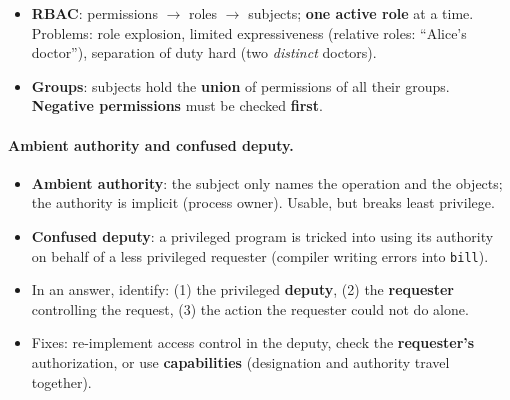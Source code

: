 \begin{itemize}
    \item \textbf{RBAC}: permissions $\to$ roles $\to$ subjects; \textbf{one active role} at a time. Problems: role explosion, limited expressiveness (relative roles: ``Alice's doctor''), separation of duty hard (two \emph{distinct} doctors).
    \item \textbf{Groups}: subjects hold the \textbf{union} of permissions of all their groups. \textbf{Negative permissions} must be checked \textbf{first}.
\end{itemize}

\paragraph{Ambient authority and confused deputy.}
\begin{itemize}
    \item \textbf{Ambient authority}: the subject only names the operation and the objects; the authority is implicit (process owner). Usable, but breaks least privilege.
    \item \textbf{Confused deputy}: a privileged program is tricked into using its authority on behalf of a less privileged requester (compiler writing errors into \texttt{bill}).
    \item In an answer, identify: (1) the privileged \textbf{deputy}, (2) the \textbf{requester} controlling the request, (3) the action the requester could not do alone.
    \item Fixes: re-implement access control in the deputy, check the \textbf{requester's} authorization, or use \textbf{capabilities} (designation and authority travel together).
\end{itemize}

